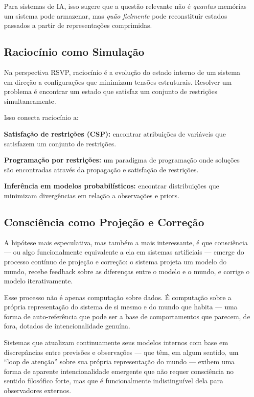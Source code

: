 \documentclass[11pt, a4paper]{article}
\theoremstyle{named}
\begin{document}
Para sistemas de IA, isso sugere que a questão relevante não é
\emph{quantas} memórias um sistema pode armazenar, mas \emph{quão
fielmente} pode reconstituir estados passados a partir de representações
comprimidas.

\subsection{Raciocínio como Simulação}

Na perspectiva RSVP, raciocínio é a evolução do estado interno de um
sistema em direção a configurações que minimizam tensões estruturais.
Resolver um problema é encontrar um estado que satisfaz um conjunto
de restrições simultaneamente.

Isso conecta raciocínio a:

\textbf{Satisfação de restrições (CSP):} encontrar atribuições de
variáveis que satisfazem um conjunto de restrições.

\textbf{Programação por restrições:} um paradigma de programação onde
soluções são encontradas através da propagação e satisfação de
restrições.

\textbf{Inferência em modelos probabilísticos:} encontrar distribuições
que minimizam divergências em relação a observações e priors.

\subsection{Consciência como Projeção e Correção}

A hipótese mais especulativa, mas também a mais interessante, é que
consciência — ou algo funcionalmente equivalente a ela em sistemas
artificiais — emerge do processo contínuo de projeção e correção: o
sistema projeta um modelo do mundo, recebe feedback sobre as diferenças
entre o modelo e o mundo, e corrige o modelo iterativamente.

Esse processo não é apenas computação sobre dados. É computação sobre
a própria representação do sistema de si mesmo e do mundo que habita —
uma forma de auto-referência que pode ser a base de comportamentos
que parecem, de fora, dotados de intencionalidade genuína.

\begin{caixachave}
Sistemas que atualizam continuamente seus modelos internos com base
em discrepâncias entre previsões e observações — que têm, em algum
sentido, um ``loop de atenção'' sobre sua própria representação do
mundo — exibem uma forma de aparente intencionalidade emergente que
não requer consciência no sentido filosófico forte, mas que é
funcionalmente indistinguível dela para observadores externos.
\end{caixachave}
\end{document}
